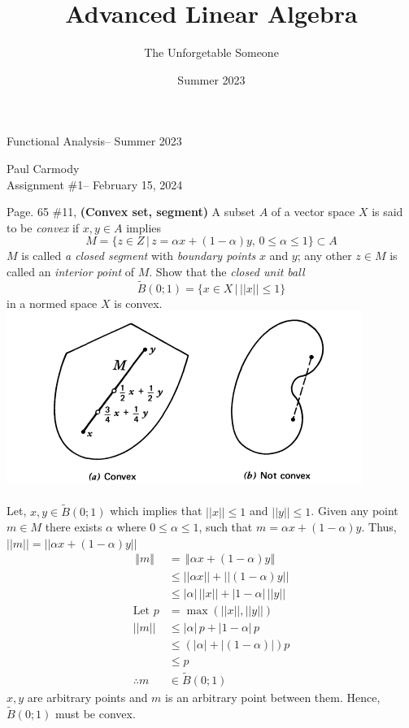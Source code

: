 \documentclass[10pt,a4paper]{report}
\title{Advanced Linear Algebra}
\author{The Unforgetable Someone}
\date{Summer 2023}
\newcommand{\CLASSNAME}{Functional Analysis}
\newcommand{\STUDENTNAME}{Paul Carmody}
\newcommand{\ASSIGNMENT}{Assignment \#1}
\newcommand{\DUEDATE}{February 15, 2024}
\newcommand{\SEMESTER}{Summer 2023}
\newcommand{\NORM}[1]{\,\left \Vert #1 \right \Vert\,}
\begin{document}
\begin{center}
	\Large{\CLASSNAME -- \SEMESTER} \\
\end{center}
\begin{center}
	\STUDENTNAME \\
	\ASSIGNMENT -- \DUEDATE\\
\end{center} 
\vskip 0.5cm

Page. 65 \#11, \textbf{(Convex set, segment)}  A subset $A$ of a vector space $X$ is said to be \textit{convex} if $x,y \in A$ implies $$ M= \{z\in Z \,|\, z=\alpha x+(1-\alpha)y, \, 0\le \alpha\le 1\} \subset A $$ $M$ is called \textit{a closed segment} with \textit{boundary points} $x$ and $y$; any other $z \in M$ is called an \textit{interior point} of $M$.  Show that the \textit{closed unit ball}  $$ \tilde{B}(0;1)=\{x\in X\,|\,||x||\le 1\} $$ in a normed space $X$ is convex.\\
\includegraphics[scale=.7]{p65ex11.png} 
\\ \\
Let, $x,y \in \tilde{B}(0;1)$ which implies that $||x|| \le 1$ and $||y|| \le 1$.  Given any point $m \in M$ there exists $\alpha$ where $0\le \alpha \le 1$, such that $m=\alpha x + (1-\alpha)y$.  Thus, $||m|| = ||\alpha x + (1-\alpha)y||$
\begin{align*}
	\NORM{m} &= \NORM{\alpha x + (1-\alpha)y} \\
		&\le ||\alpha x|| + ||(1-\alpha)y||\\
		&\le |\alpha| \, ||x|| + |1-\alpha| \, ||y|| \\
	\text{Let } p &= \max(||x||,||y||) \\
	||m|| &\le |\alpha| \, p + |1-\alpha| \, p \\
		&\le (|\alpha| + |(1-\alpha)|)p \\
		&\le p \\
	\therefore m &\in \tilde{B}(0;1)
\end{align*}$x,y$ are arbitrary points and $m$ is an arbitrary point between them.  Hence, $\tilde{B}(0;1)$ must be convex.
\end{document}
